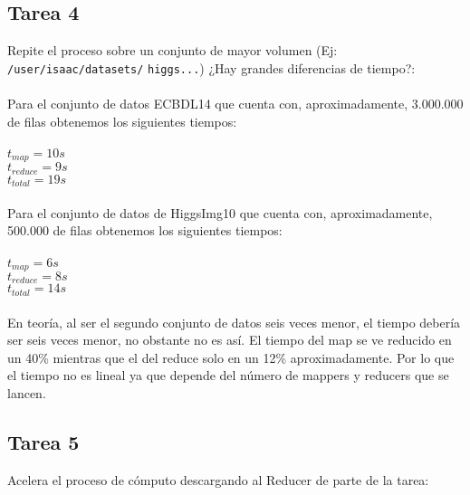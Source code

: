 \subsection{Tarea 4}

Repite el proceso sobre un conjunto de mayor volumen (Ej: \texttt{/user/isaac/datasets/} \texttt{higgs...}) ¿Hay grandes diferencias de tiempo?:
\\ \\
Para el conjunto de datos ECBDL14 que cuenta con, aproximadamente, 3.000.000 de filas obtenemos los siguientes tiempos:
\\ \\
$ t_{map} = 10s $
\\
$ t_{reduce} = 9s $
\\
$ t_{total} = 19s $
\\ \\
Para el conjunto de datos de HiggsImg10 que cuenta con, aproximadamente, 500.000 de filas obtenemos los siguientes tiempos:
\\ \\
$ t_{map} = 6s $
\\
$ t_{reduce} = 8s $
\\
$ t_{total} = 14s $
\\ \\
En teoría, al ser el segundo conjunto de datos seis veces menor, el tiempo debería ser seis veces menor, no obstante no es así. El tiempo del map se ve reducido en un 40\% mientras que el del reduce solo en un 12\% aproximadamente. Por lo que el tiempo no es lineal ya que depende del número de mappers y reducers que se lancen.

\subsection{Tarea 5}

Acelera el proceso de cómputo descargando al Reducer de parte de la tarea:






